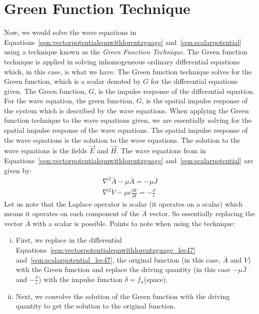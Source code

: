 \chapter{Green Function Technique}
Now, we would solve the wave equations in Equations~\eqref{eqn:vectorpotentialeqnwithlorentzguage} and~\eqref{eqn:scalarpotential} using a technique known as the \emph{Green Function Technique}. The Green function technique is applied in solving inhomogeneous ordinary differential equations which, in this case, is what we have. The Green function technique solves for the Green function, which is a scalar denoted by $G$ for the differential equations given. The Green function, $G$, is the impulse response of the differential equation. For the wave equation, the green function, $G$, is the spatial impulse response of the system which is described by the wave equations. When applying the Green function technique to the wave equations given, we are essentially solving for the spatial impulse response of the wave equations. The spatial impulse response of the wave equations is the solution to the wave equations. The solution to the wave equations is the fields $\vec{E}$ and $\vec{H}$. The wave equations from in Equations~\eqref{eqn:vectorpotentialeqnwithlorentzguage} and~\eqref{eqn:scalarpotential} are given by:
\begin{align}
\nabla^{2}\bar{A}-\mu\bar{A} = -\mu\bar{J}
\label{eqn:vectorpotentialeqnwithlorentzguage_lec47}\\
\nabla^{2}V-\mu\epsilon\frac{\partial V}{\partial t} = -\frac{\rho}{\epsilon}
\label{eqn:scalarpotential_lec47}
\end{align}
Let us note that the Laplace operator is scalar (it operates on a scalar) which means it operates on each component of the $\bar{A}$ vector. So essentially replacing the vector $\bar{A}$ with a scalar is possible.
Points to note when using the technique:
\begin{enumerate}[(i)]
\item First, we replace in the differential Equations~\eqref{eqn:vectorpotentialeqnwithlorentzguage_lec47} and~\eqref{eqn:scalarpotential_lec47}, the original function (in this case, $\bar{A}$ and $V$) with the Green function and replace the driving quantity (in this case $-\mu\bar{J}$ and $-\frac{\rho}{\epsilon}$) with the impulse function $\delta = f_{n}$(space).
\item Next, we convolve the solution of the Green function with the driving quantity to get the solution to the original function.
\end{enumerate}

